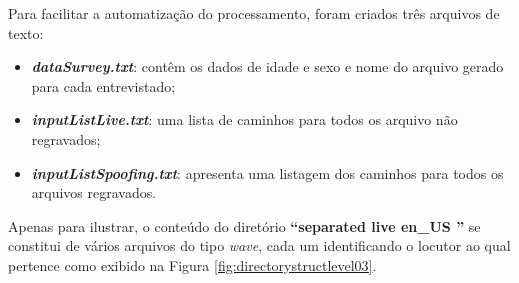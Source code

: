 		\par Para facilitar a automatização do processamento, foram criados três arquivos de texto:
		\begin{itemize}
			\item \textit{\textbf{dataSurvey.txt}}: contêm os dados de idade e sexo e nome do arquivo gerado para cada entrevistado;
			\item \textit{\textbf{inputListLive.txt}}: uma lista de caminhos para todos os arquivo não regravados;
			\item \textit{\textbf{inputListSpoofing.txt}}: apresenta uma listagem dos caminhos para todos os arquivos regravados.
		\end{itemize}
	
		\par Apenas para ilustrar, o conteúdo do diretório \textbf{``separated \textfractionsolidus live \textfractionsolidus en\_US ''} se constitui de vários arquivos do tipo \textit{wave}, cada um identificando o locutor ao qual pertence como exibido na Figura \ref{fig:directorystructlevel03}.

